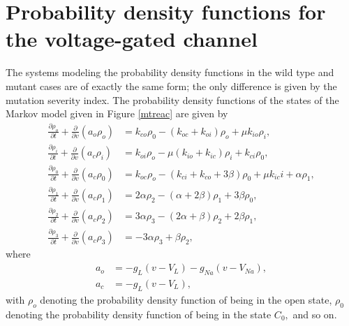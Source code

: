 \section[Probability density functions]{Probability density functions for the
voltage-gated channel}
The systems modeling the probability density functions in the wild type 
and mutant cases are of exactly the same form; the only difference is
given by the mutation severity index. 
The probability density functions of the states of the Markov model given in
Figure \ref{mtreac} are given by
\begin{align}
\frac{\partial\rho_{o}}{\partial t}+\frac{\partial}{\partial v}\left(
a_{o}\rho_{o}\right)   &  =k_{co}\rho_{0}-\left(  k_{oc}+k_{oi}\right)
\rho_{o}+\mu k_{io}\rho_{i},\nonumber\\
\frac{\partial\rho_{i}}{\partial t}+\frac{\partial}{\partial v}\left(
a_{c}\rho_{i}\right)   &  =k_{oi}\rho_{o}-\mu\left(  k_{io}+k_{ic}\right)
\rho_{i}+k_{ci}\rho_{0},\nonumber\\
\frac{\partial\rho_{0}}{\partial t}+\frac{\partial}{\partial v}\left(
a_{c}\rho_{0}\right)   &  =k_{oc}\rho_{o}-\left(  k_{ci}+k_{co}+3\beta\right)
\rho_{0}+\mu k_{ic}i +\alpha \rho_{1} ,\label{vgpdf}\\
\frac{\partial\rho_{1}}{\partial t}+\frac{\partial}{\partial v}\left(
a_{c}\rho_{1}\right)   &  =2\alpha\rho_{2}-\left(  \alpha+2\beta\right)
\rho_{1}+3\beta\rho_{0},\nonumber\\
\frac{\partial\rho_{2}}{\partial t}+\frac{\partial}{\partial v}\left(
a_{c}\rho_{2}\right)   &  =3\alpha\rho_{3}-\left(  2\alpha+\beta\right)
\rho_{2}+2\beta\rho_{1},\nonumber\\
\frac{\partial\rho_{3}}{\partial t}+\frac{\partial}{\partial v}\left(
a_{c}\rho_{3}\right)   &  =-3\alpha\rho_{3}+\beta\rho_{2},\nonumber
\end{align}
where
\begin{align}
a_{o} &  =-g_{L}\left(  v-V_{L}\right)  -g_{Na}(v-V_{Na}),\label{sflux}\\
a_{c} &  =-g_{L}\left(  v-V_{L}\right)  ,\nonumber
\end{align}
with $\rho_{o}$ denoting the probability density function of being in the open
state, $\rho_{0}$ denoting the probability density function of being in the
state $C_{0},$ and so on.


